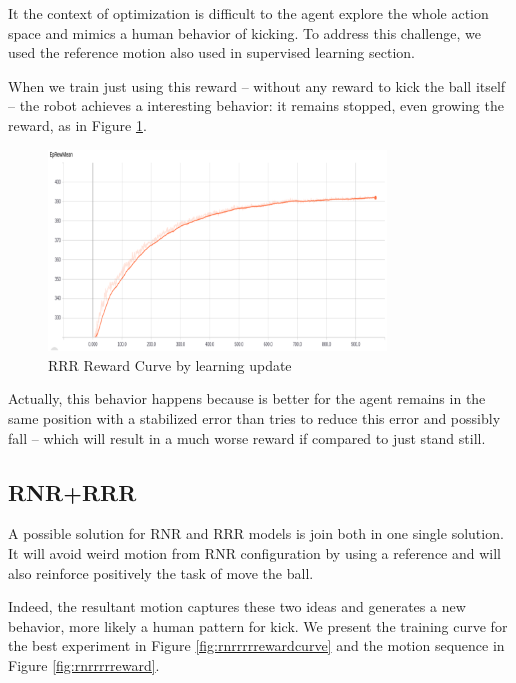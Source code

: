 It the context of optimization is difficult to the agent explore the whole action space and mimics a human behavior of kicking. To address this challenge, we used the reference motion also used in supervised learning section.

When we train just using this reward -- without any reward to kick the ball itself -- the robot achieves a interesting behavior: it remains stopped, even growing the reward, as in Figure \ref{fig:rrrreward}.

\begin{figure}[!htbp]
	\centering
	\includegraphics[width=0.8\textwidth]{Cap6/rrrreward.eps}
	\caption{RRR Reward Curve by learning update}
	\label{fig:rrrreward}
\end{figure}

Actually, this behavior happens because is better for the agent remains in the same position with a stabilized error than tries to reduce this error and possibly fall -- which will result in a much worse reward if compared to just stand still.

\subsection{RNR+RRR}

A possible solution for RNR and RRR models is join both in one single solution. It will avoid weird motion from RNR configuration by using a reference and will also reinforce positively the task of move the ball.

Indeed, the resultant motion captures these two ideas and generates a new behavior, more likely a human pattern for kick. We present the training curve for the best experiment in Figure \ref{fig:rnrrrrrewardcurve} and the motion sequence in Figure \ref{fig:rnrrrrreward}.

